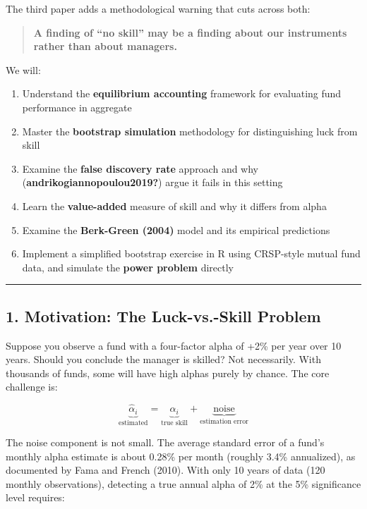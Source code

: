 \documentclass[
  letterpaper,
  DIV=11,
  numbers=noendperiod]{scrartcl}
\providecommand{\tightlist}{%
  \setlength{\itemsep}{0pt}\setlength{\parskip}{0pt}}
\begin{document}
The third paper adds a methodological warning that cuts across both:

\begin{quote}
\textbf{A finding of ``no skill'' may be a finding about our instruments
rather than about managers.}
\end{quote}

We will:

\begin{enumerate}
\def\labelenumi{\arabic{enumi}.}
\tightlist
\item
  Understand the \textbf{equilibrium accounting} framework for
  evaluating fund performance in aggregate
\item
  Master the \textbf{bootstrap simulation} methodology for
  distinguishing luck from skill
\item
  Examine the \textbf{false discovery rate} approach and why
  (\textbf{andrikogiannopoulou2019?}) argue it fails in this setting
\item
  Learn the \textbf{value-added} measure of skill and why it differs
  from alpha
\item
  Examine the \textbf{Berk-Green (2004)} model and its empirical
  predictions
\item
  Implement a simplified bootstrap exercise in R using CRSP-style mutual
  fund data, and simulate the \textbf{power problem} directly
\end{enumerate}

\begin{center}\rule{0.5\linewidth}{0.5pt}\end{center}

\subsection{1. Motivation: The Luck-vs.-Skill
Problem}\label{motivation-the-luck-vs.-skill-problem}

Suppose you observe a fund with a four-factor alpha of +2\% per year
over 10 years. Should you conclude the manager is skilled? Not
necessarily. With thousands of funds, some will have high alphas purely
by chance. The core challenge is:

\[\underbrace{\hat{\alpha}_i}_{\text{estimated}} = \underbrace{\alpha_i}_{\text{true skill}} + \underbrace{\text{noise}}_{\text{estimation error}}\]

The noise component is not small. The average standard error of a fund's
monthly alpha estimate is about 0.28\% per month (roughly 3.4\%
annualized), as documented by Fama and French (2010). With only 10 years
of data (120 monthly observations), detecting a true annual alpha of 2\%
at the 5\% significance level requires:
\end{document}
